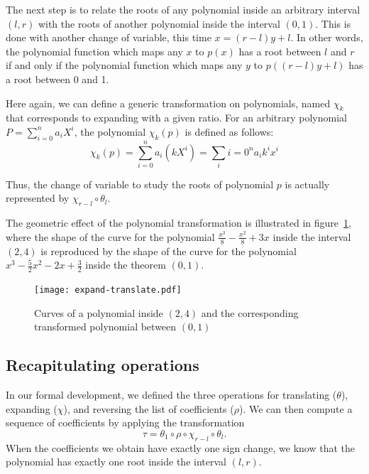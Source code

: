 \documentclass{mscs}
\begin{document}
The next step is to relate the roots of any polynomial inside an
arbitrary interval \((l,r)\) with the roots of another
polynomial inside the interval \((0,1)\).  This is done with another
change of variable, this time \(x= (r-l) y + l\). In other words, the
polynomial function which maps any \(x\) to \(p(x)\) has a root
between \(l\) and \(r\) if and only if the polynomial function which
maps any \(y\) to \(p((r - l) y + l)\) has a root between 0 and 1.

Here again, we can define a generic transformation on polynomials,
named \(\chi_k\) that corresponds to expanding with a given ratio.
For an arbitrary polynomial \(P=\sum_{i=0}^n a_i X^i\), the polynomial
\(\chi_k(p)\) is defined as follows:
\[\chi_k(p) = \sum_{i=0}^n a_i(kX^i) = \sum_i{i=0}^n a_ik^i x^i\]

Thus, the change of variable to study the roots of polynomial \(p\)
is actually represented by \(\chi_{r-l}\circ \theta_l\).

The geometric effect of the polynomial transformation
is illustrated in figure~\ref{expand-translate}, where the shape
of the curve for the polynomial \(\frac{x^3}{8} - \frac{x^2}{8} + 3
x\) inside the interval \((2,4)\) is reproduced by the shape of the
curve for the polynomial \(x^3 -\frac{5}{2}x^2-2x+\frac{3}{2}\) inside
the theorem \((0,1)\).
\begin{figure}
\begin{center}\label{expand-translate}
\texttt{[image: expand-translate.pdf]}
\end{center}
\caption{Curves of a polynomial inside \((2,4)\) and the
  corresponding transformed polynomial between \((0,1)\)}
\end{figure}
\subsection{Recapitulating operations}\label{ssec:ops}
In our formal development, we defined the three operations for
translating (\(\theta\)), expanding (\(\chi\)),
 and reversing the list of coefficients (\(\rho\)).  We can then
compute a sequence of coefficients by applying the transformation
\[\tau = \theta_1\circ\rho\circ \chi_{r-l}\circ \theta_{l}.\]
When the coefficients we obtain have exactly one sign change, we
know that the polynomial has exactly one root inside the interval
\((l,r)\).
\end{document}
